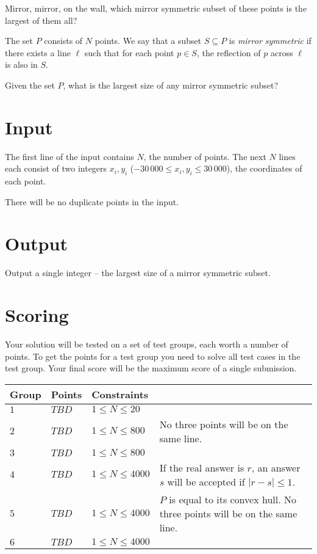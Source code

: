 
Mirror, mirror, on the wall, which mirror symmetric subset of these points is the largest of them all?

The set $P$ consists of $N$ points.
We say that a subset $S \subseteq P$ is \emph{mirror symmetric} if there exists a line $\ell$ such that for each point $p \in S$, the reflection of $p$ across $\ell$ is also in $S$.

Given the set $P$, what is the largest size of any mirror symmetric subset?

\section*{Input}
The first line of the input contains $N$, the number of points.
The next $N$ lines each consist of two integers $x_i, y_i$ ($-30\,000 \le x_i, y_i \le 30\,000$), the coordinates of each point.

There will be no duplicate points in the input.

\section*{Output}
Output a single integer -- the largest size of a mirror symmetric subset.

\section*{Scoring}
Your solution will be tested on a set of test groups, each worth a number of points.
To get the points for a test group you need to solve all test cases in the test group.
Your final score will be the maximum score of a single submission.

\noindent
\begin{tabular}{| l | l | l | l |}
\hline
Group & Points & Constraints \\ \hline
$1$    & $TBD$         & $1 \leq N \leq 20$ & \\ \hline
$2$    & $TBD$         & $1 \leq N \leq 800$ & No three points will be on the same line.\\ \hline
$3$    & $TBD$         & $1 \leq N \leq 800$ & \\ \hline
$4$    & $TBD$         & $1 \leq N \leq 4000$ & If the real answer is $r$, an answer $s$ will be accepted if $|r-s| \leq 1$.\\ \hline
$5$    & $TBD$         & $1 \leq N \leq 4000$ & $P$ is equal to its convex hull. No three points will be on the same line.\\ \hline
$6$    & $TBD$         & $1 \leq N \leq 4000$ & \\ \hline
\end{tabular}
